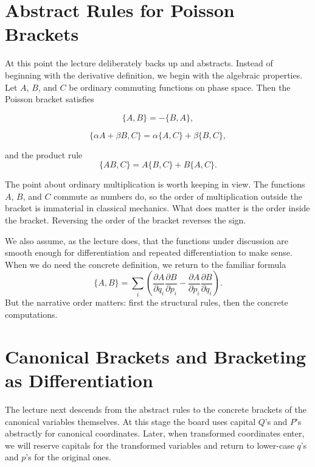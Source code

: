 \section{Abstract Rules for Poisson Brackets}

At this point the lecture deliberately backs up and abstracts. Instead of beginning with the derivative definition, we begin with the algebraic properties. Let \(A\), \(B\), and \(C\) be ordinary commuting functions on phase space. Then the Poisson bracket satisfies

\begin{equation}
\{A,B\}=-\{B,A\},
\end{equation}

\begin{equation}
\{\alpha A+\beta B,C\}=\alpha\{A,C\}+\beta\{B,C\},
\end{equation}

and the product rule
\begin{equation}
\{AB,C\}=A\{B,C\}+B\{A,C\}.
\end{equation}

The point about ordinary multiplication is worth keeping in view. The functions \(A\), \(B\), and \(C\) commute as numbers do, so the order of multiplication outside the bracket is immaterial in classical mechanics. What does matter is the order inside the bracket. Reversing the order of the bracket reverses the sign.

We also assume, as the lecture does, that the functions under discussion are smooth enough for differentiation and repeated differentiation to make sense. When we do need the concrete definition, we return to the familiar formula
\begin{equation}
\{A,B\}=\sum_i \left(\frac{\partial A}{\partial q_i}\frac{\partial B}{\partial p_i}-\frac{\partial A}{\partial p_i}\frac{\partial B}{\partial q_i}\right).
\end{equation}
But the narrative order matters: first the structural rules, then the concrete computations.

\section{Canonical Brackets and Bracketing as Differentiation}

The lecture next descends from the abstract rules to the concrete brackets of the canonical variables themselves. At this stage the board uses capital \(Q\)'s and \(P\)'s abstractly for canonical coordinates. Later, when transformed coordinates enter, we will reserve capitals for the transformed variables and return to lower-case \(q\)'s and \(p\)'s for the original ones.

